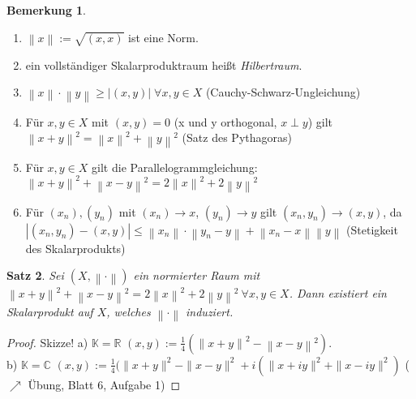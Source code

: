 \documentclass[ngerman]{report}
\theoremstyle{plain}%
\newtheorem{thm}{Satz}[chapter]
\theoremstyle{definition}%
\theoremstyle{myStyle}
\newtheorem{bem}[thm]{Bemerkung}
\newcommand{\C}{\mathbb{C}}
\newcommand{\R}{\mathbb{R}}
\newcommand{\K}{\mathbb{K}}
\newcommand{\norm}[1]{\left \|#1\right\| }
\begin{document}
	\begin{bem}
		\begin{enumerate}[1)]
			\item $\norm{x} := \sqrt{(x,x)}$ ist eine Norm.
			\item ein vollständiger Skalarproduktraum heißt \textit{Hilbertraum}.
			\item $\norm{x} \cdot \norm{y} \geq |(x,y)| \; \forall x,y \in X$ (Cauchy-Schwarz-Ungleichung)

			\item Für $x,y \in X$ mit $(x,y) = 0$ (x und y orthogonal, $x \perp y$)
			gilt $\norm{x + y}^2 = \norm{x}^2 + \norm{y}^2$ (Satz des Pythagoras)
			\item Für $x,y \in X$ gilt die Parallelogrammgleichung: 
				$\norm{x + y} ^2 + \norm{x - y}^2 = 2 \norm{x}^2 + 2\norm{y}^2$
			\item	Für $(x_n), (y_n)$ mit $(x_n) \to x$, $(y_n) \to y$ gilt 
				$(x_n, y_n) \to (x,y)$, da\\ 
				$|(x_n, y_n) - (x,y)| \leq \norm{x_n}\cdot \norm{y_n - y} + \norm{x_n - x}\norm{y}$ (Stetigkeit des Skalarprodukts)
		\end{enumerate}
	\end{bem}
	\begin{thm}
	Sei $(X,\norm{\cdot})$ ein normierter Raum mit $\norm{x+y}^2 + \norm{x-y}^2 = 2\norm{x}^2 +2\norm{y}^2 ~\forall x,y \in X$. Dann existiert ein Skalarprodukt auf $X$, welches $\norm{\cdot}$ induziert.
	\end{thm}
	\begin{proof}
		Skizze! a) $\K = \R$ $(x,y) := \frac{1}{4}(\norm{x + y}^2 - \norm{x-y}^2)$.\\ b) $\K = \C$ $(x,y) := \frac{1}{4}(\| x+y\|^2 - \|x-y\|^2 + i(\|x+iy\|^2 + \|x-iy\|^2)$ ($\nearrow$ Übung, Blatt 6, Aufgabe 1)
	\end{proof}
\end{document}
